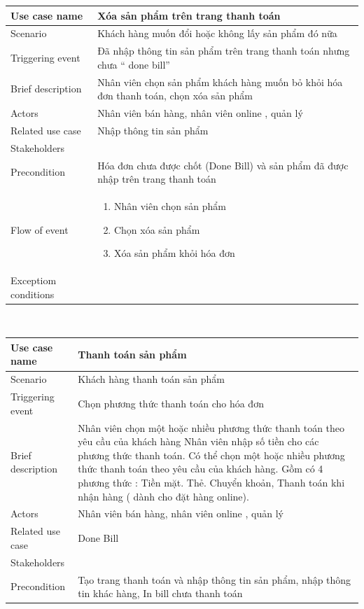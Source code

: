 \documentclass{article}
\begin{document}
		 	\begin{tabular}{|m{4cm}|m{12cm}|}
		\hline
		Use case name & Xóa sản phẩm trên trang thanh toán  \\
		\hline
		Scenario & Khách hàng muốn đổi hoặc không lấy sản phẩm đó nữa \\
		\hline
		Triggering event & Đã nhập thông tin sản phẩm trên trang thanh toán nhưng chưa “ done bill” \\
		\hline
		Brief description & Nhân viên chọn sản phẩm khách hàng muốn bỏ khỏi hóa đơn thanh toán, chọn xóa sản phẩm \\
		\hline
		Actors & Nhân viên bán hàng, nhân viên online , quản lý \\
		\hline
		Related use case & Nhập thông tin sản phẩm\\
		\hline
		Stakeholders & \\
		\hline
		Precondition & Hóa đơn chưa được chốt (Done Bill) và sản phẩm đã được nhập trên trang thanh toán\\
		\hline
		
		Flow of event & 
			\begin{enumerate}
				\item Nhân viên chọn sản phẩm
				\item Chọn xóa sản phẩm
				\item Xóa sản phẩm khỏi hóa đơn
			\end{enumerate}\\
		\hline
		Exceptiom conditions & \\
		\hline
\end{tabular}\\[0.2cm]

\begin{tabular}{|m{4cm}|m{12cm}|}
		\hline
		Use case name & Thanh toán sản phẩm\\
		\hline
		Scenario & Khách hàng thanh toán sản phẩm\\
		\hline
		Triggering event & Chọn phương thức thanh toán cho hóa đơn\\
		\hline
		Brief description & Nhân viên chọn một hoặc nhiều phương thức thanh toán theo yêu cầu của khách hàng
Nhân viên nhập số tiền cho các phương thức thanh toán. Có thể chọn một hoặc nhiều phương thức  thanh toán theo yêu cầu của khách hàng. Gồm có 4 phương thức : Tiền mặt. Thẻ. Chuyển khoản, Thanh toán khi nhận hàng ( dành cho đặt hàng online).
\\
		\hline
		 Actors & Nhân viên bán hàng, nhân viên online , quản lý\\
		\hline
		Related use case & Done Bill\\
		\hline
		Stakeholders & \\
		\hline
		Precondition & Tạo trang thanh toán và nhập thông tin sản phẩm, nhập thông tin khác hàng, In bill chưa thanh toán\\
		\hline
		
		\end{tabular}
		
\end{document}
